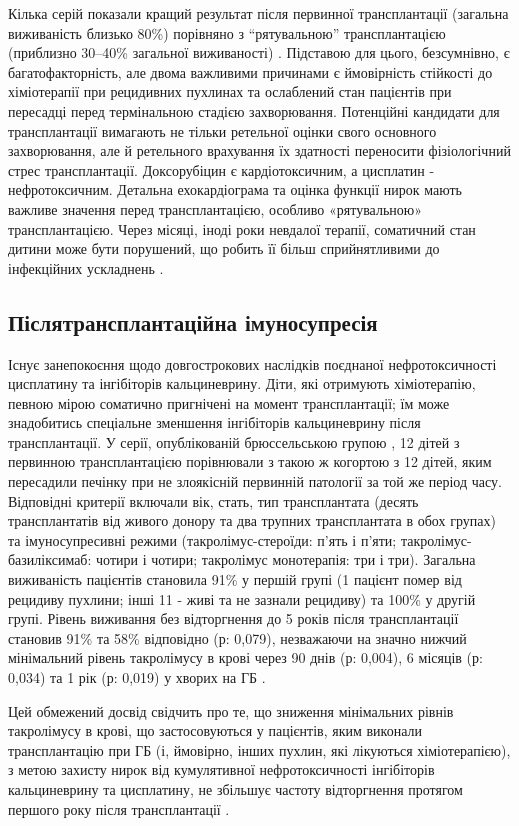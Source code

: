 Кілька серій показали кращий результат після первинної трансплантації (загальна виживаність близько 80\%) порівняно з “рятувальною” трансплантацією (приблизно 30–40\% загальної виживаності) \cite{pmid15285242}. Підставою для цього, безсумнівно, є багатофакторність, але двома важливими причинами є ймовірність стійкості до хіміотерапії при рецидивних пухлинах та ослаблений стан пацієнтів при пересадці перед термінальною стадією захворювання. Потенційні кандидати для трансплантації вимагають не тільки ретельної оцінки свого основного захворювання, але й ретельного врахування їх здатності переносити фізіологічний стрес трансплантації. Доксорубіцин є кардіотоксичним, а цисплатин - нефротоксичним. Детальна ехокардіограма та оцінка функції нирок мають важливе значення перед трансплантацією, особливо «рятувальною» трансплантацією. Через місяці, іноді роки невдалої терапії, соматичний стан дитини може бути порушений, що робить її більш сприйнятливими до інфекційних ускладнень \cite{pmid15285242}.

\subsection{Післятрансплантаційна імуносупресія}

Існує занепокоєння щодо довгострокових наслідків поєднаної нефротоксичності цисплатину та інгібіторів кальциневрину. Діти, які отримують хіміотерапію, певною мірою соматично пригнічені на момент трансплантації; їм може знадобитись спеціальне зменшення інгібіторів кальциневрину після трансплантації. У серії, опублікованій брюссельською групою \cite{pmid18444949}, 12 дітей з первинною трансплантацією порівнювали з такою ж когортою з 12 дітей, яким пересадили печінку при не злоякісній первинній патології за той же період часу. Відповідні критерії включали вік, стать, тип трансплантата (десять трансплантатів від живого донору та два трупних трансплантата в обох групах) та імуносупресивні режими (такролімус-стероїди: п’ять і п’яти; такролімус-базиліксимаб: чотири і чотири; такролімус монотерапія: три і три). Загальна виживаність пацієнтів становила 91\% у першій групі (1 пацієнт помер від рецидиву пухлини; інші 11 - живі та не зазнали рецидиву) та 100\% у другій групі. Рівень виживання без відторгнення до 5 років після трансплантації становив 91\% та 58\% відповідно (р: 0,079), незважаючи на значно нижчий мінімальний рівень такролімусу в крові через 90 днів (р: 0,004), 6 місяців (р: 0,034) та 1 рік (р: 0,019) у хворих на ГБ \cite{pmid16185597}. 

Цей обмежений досвід свідчить про те, що зниження мінімальних рівнів такролімусу в крові, що застосовуються у пацієнтів, яким виконали трансплантацію при ГБ (і, ймовірно, інших пухлин, які лікуються хіміотерапією), з метою захисту нирок від кумулятивної нефротоксичності інгібіторів кальциневрину та цисплатину, не збільшує частоту відторгнення протягом першого року після трансплантації \cite{pmid20223320}.


